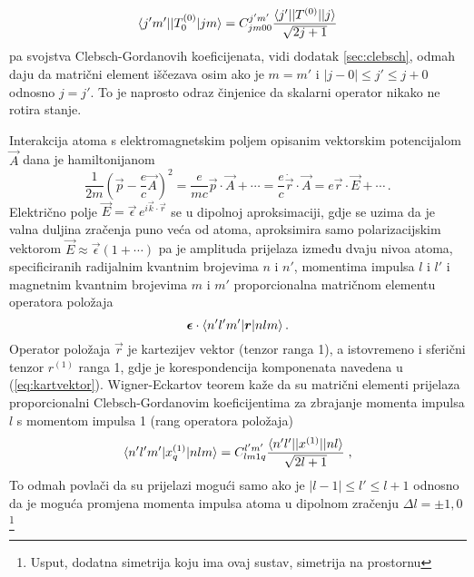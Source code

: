 \begin{primjer}
\begin{displaymath}
\langle j'm' ||T^{(0)}_0| jm \rangle = C^{j'm'}_{jm00}
\frac{\langle j' ||T^{(0)}|| j \rangle}{\sqrt{2j+1}}
\end{displaymath}
pa svojstva Clebsch-Gordanovih koeficijenata, vidi dodatak \ref{sec:clebsch},
odmah daju da matrični element iščezava osim ako je $m=m'$ i
$|j-0|\leq j' \leq j+0$ odnosno $j=j'$. To je naprosto odraz
činjenice da skalarni operator nikako ne rotira stanje.
\end{primjer}


\begin{primjer}
Interakcija atoma s elektromagnetskim poljem opisanim vektorskim
potencijalom $\vec{A}$ dana je hamiltonijanom
\begin{equation}
    \frac{1}{2m}\left(\vec{p} - \frac{e}{c}\vec{A}\right)^2
    = \frac{e}{mc} \vec{p}\cdot\vec{A} + \cdots
    = \frac{e}{c} \dot{\vec{r}} \cdot \vec{A}
    = e \vec{r} \cdot \vec{E} + \cdots \,.
\end{equation}
Električno polje $\vec{E} = \vec{\epsilon}\, e^{i \vec{k}\cdot\vec{r}}$ se 
u dipolnoj aproksimaciji, gdje se uzima da je valna duljina zračenja puno
veća od atoma, aproksimira samo polarizacijskim vektorom 
$\vec{E}\approx\vec{\epsilon}(1+\cdots)$
pa je amplituda prijelaza između dvaju nivoa atoma, specificiranih
radijalnim kvantnim brojevima $n$ i $n'$, momentima impulsa
$l$ i $l'$ i magnetnim kvantnim brojevima $m$ i $m'$ proporcionalna
matričnom elementu operatora položaja
\begin{equation}
    \vec{\epsilon} \cdot \bra{n'l'm'}\vec{r}\ket{nlm}  \,.
\end{equation}
Operator položaja $\vec{r}$ je kartezijev vektor (tenzor
ranga 1), a istovremeno i sferični tenzor $r^{(1)}$ ranga 1, gdje
je korespondencija komponenata navedena u (\ref{eq:kartvektor}).
Wigner-Eckartov teorem kaže da su matrični elementi prijelaza
proporcionalni Clebsch-Gordanovim koeficijentima za zbrajanje
momenta impulsa $l$ s momentom impulsa 1 (rang operatora položaja)
\begin{displaymath}
 \langle n'l'm' |x^{(1)}_q | nlm \rangle = C^{l'm'}_{lm1q}
\frac{\langle n'l' ||x^{(1)}|| nl \rangle}{\sqrt{2l+1}} \;,
\end{displaymath}
To odmah povlači da su prijelazi mogući samo ako
je $|l-1|\leq l' \leq l+1$ odnosno da je moguća promjena
momenta impulsa atoma u dipolnom zračenju $\Delta l = \pm 1,0$\footnote{Usput,
    dodatna simetrija koju ima ovaj sustav, simetrija na prostornu
}
\end{primjer}
